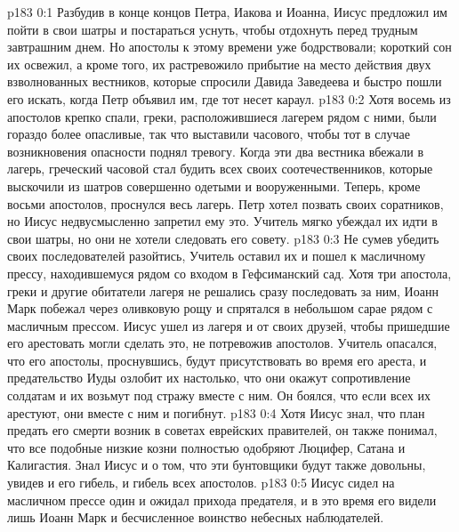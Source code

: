 \vs p183 0:1 Разбудив в конце концов Петра, Иакова и Иоанна, Иисус предложил им пойти в свои шатры и постараться уснуть, чтобы отдохнуть перед трудным завтрашним днем. Но апостолы к этому времени уже бодрствовали; короткий сон их освежил, а кроме того, их растревожило прибытие на место действия двух взволнованных вестников, которые спросили Давида Заведеева и быстро пошли его искать, когда Петр объявил им, где тот несет караул.
\vs p183 0:2 Хотя восемь из апостолов крепко спали, греки, расположившиеся лагерем рядом с ними, были гораздо более опасливые, так что выставили часового, чтобы тот в случае возникновения опасности поднял тревогу. Когда эти два вестника вбежали в лагерь, греческий часовой стал будить всех своих соотечественников, которые выскочили из шатров совершенно одетыми и вооруженными. Теперь, кроме восьми апостолов, проснулся весь лагерь. Петр хотел позвать своих соратников, но Иисус недвусмысленно запретил ему это. Учитель мягко убеждал их идти в свои шатры, но они не хотели следовать его совету.
\vs p183 0:3 Не сумев убедить своих последователей разойтись, Учитель оставил их и пошел к масличному прессу, находившемуся рядом со входом в Гефсиманский сад. Хотя три апостола, греки и другие обитатели лагеря не решались сразу последовать за ним, Иоанн Марк побежал через оливковую рощу и спрятался в небольшом сарае рядом с масличным прессом. Иисус ушел из лагеря и от своих друзей, чтобы пришедшие его арестовать могли сделать это, не потревожив апостолов. Учитель опасался, что его апостолы, проснувшись, будут присутствовать во время его ареста, и предательство Иуды озлобит их настолько, что они окажут сопротивление солдатам и их возьмут под стражу вместе с ним. Он боялся, что если всех их арестуют, они вместе с ним и погибнут.
\vs p183 0:4 Хотя Иисус знал, что план предать его смерти возник в советах еврейских правителей, он также понимал, что все подобные низкие козни полностью одобряют Люцифер, Сатана и Калигастия. Знал Иисус и о том, что эти бунтовщики будут также довольны, увидев и его гибель, и гибель всех апостолов.
\vs p183 0:5 Иисус сидел на масличном прессе один и ожидал прихода предателя, и в это время его видели лишь Иоанн Марк и бесчисленное воинство небесных наблюдателей.
